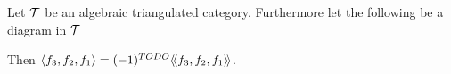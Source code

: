 \begin{theorem}
    Let \( {\mathcal{T}} \) be an algebraic triangulated category. Furthermore let the following be a diagram in \( {\mathcal{T}} \)
    \begin{center}
    \end{center}
    Then \( \langle f_3, f_2, f_1 \rangle = (-1)^{TODO} \langle \! \langle f_3, f_2, f_1 \rangle \! \rangle \).
\end{theorem}